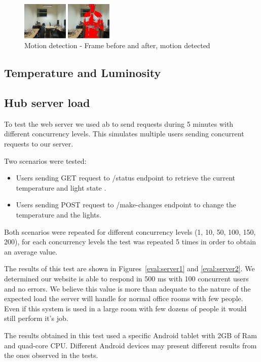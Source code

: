 \begin{figure}[h]
\centering
\includegraphics[width=0.4\textwidth]{Figures/eval_motion}
\caption{Motion detection - Frame before and after, motion detected }
\label{eval:motion_fig}
\end{figure}



\subsection{Temperature and Luminosity}




\subsection{Hub server load}

To test the web server we used \ac{ab} to send requests during 5 minutes with different concurrency levels. This simulates multiple users sending concurrent requests to our server.

Two scenarios were tested:
\begin{itemize}
  \item Users sending GET request to /status endpoint to retrieve the current temperature and light state .
  \item Users sending POST request to /make-changes endpoint to change the temperature and the lights.
\end{itemize} 

Both scenarios were repeated for different concurrency levels (1, 10, 50, 100, 150, 200), for each concurrency levels the test was repeated 5 times in order to obtain an average value. 

The results of this test are shown in Figures~\ref{eval:server1} and \ref{eval:server2}. We determined our website is able to respond in 500 ms with 100 concurrent users and no errors. We believe this value is more than adequate to the nature of the expected load the server will handle for normal office rooms with few people. Even if this system is used in a large room with few dozens of people it would still perform it's job.


The results obtained in this test used a specific Android tablet with 2GB of Ram and quad-core CPU. Different Android devices may present different results from the ones observed in the tests. 

